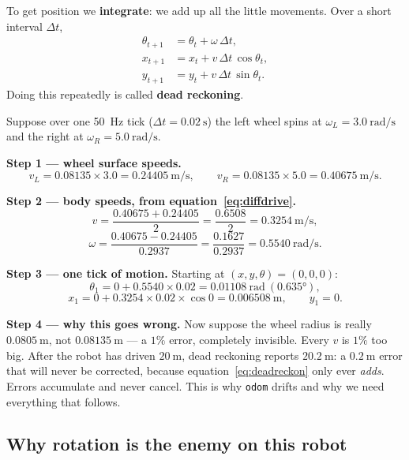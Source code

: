 \documentclass[11pt,a4paper]{report}
\newcommand{\term}[1]{\textcolor{rust}{\textbf{#1}}}
\newcommand{\file}[1]{\texttt{\small #1}}
\begin{document}
To get position we \term{integrate}: we add up all the little movements. Over
a short interval $\Delta t$,
\begin{equation}
\begin{aligned}
\theta_{t+1} &= \theta_t + \omega\,\Delta t, \\
x_{t+1} &= x_t + v\,\Delta t\,\cos\theta_t, \\
y_{t+1} &= y_t + v\,\Delta t\,\sin\theta_t .
\end{aligned}
\label{eq:deadreckon}
\end{equation}
Doing this repeatedly is called \term{dead reckoning}.

\begin{handbox}
Suppose over one \SI{50}{\hertz} tick ($\Delta t = \SI{0.02}{\second}$) the
left wheel spins at $\omega_L = \SI{3.0}{\radian\per\second}$ and the right at
$\omega_R = \SI{5.0}{\radian\per\second}$.

\smallskip
\textbf{Step 1 --- wheel surface speeds.}
\[
v_L = 0.08135 \times 3.0 = \SI{0.24405}{\metre\per\second}, \qquad
v_R = 0.08135 \times 5.0 = \SI{0.40675}{\metre\per\second}.
\]

\textbf{Step 2 --- body speeds, from equation~\eqref{eq:diffdrive}.}
\[
v = \frac{0.40675 + 0.24405}{2} = \frac{0.6508}{2} = \SI{0.3254}{\metre\per\second},
\]
\[
\omega = \frac{0.40675 - 0.24405}{0.2937} = \frac{0.1627}{0.2937}
= \SI{0.5540}{\radian\per\second}.
\]

\textbf{Step 3 --- one tick of motion.} Starting at
$(x,y,\theta) = (0,0,0)$:
\[
\theta_{1} = 0 + 0.5540 \times 0.02 = \SI{0.01108}{\radian}\ (\ang{0.635}),
\]
\[
x_{1} = 0 + 0.3254 \times 0.02 \times \cos 0 = \SI{0.006508}{\metre},
\qquad y_1 = 0 .
\]

\textbf{Step 4 --- why this goes wrong.} Now suppose the wheel radius is
really $\SI{0.0805}{\metre}$, not $\SI{0.08135}{\metre}$ --- a $1\%$ error,
completely invisible. Every $v$ is $1\%$ too big. After the robot has driven
$\SI{20}{\metre}$, dead reckoning reports $\SI{20.2}{\metre}$: a
$\SI{0.2}{\metre}$ error that will never be corrected, because
equation~\eqref{eq:deadreckon} only ever \emph{adds}. Errors accumulate and
never cancel. This is why \file{odom} drifts and why we need everything that
follows.
\end{handbox}

\subsection{Why rotation is the enemy on this robot}
\end{document}
